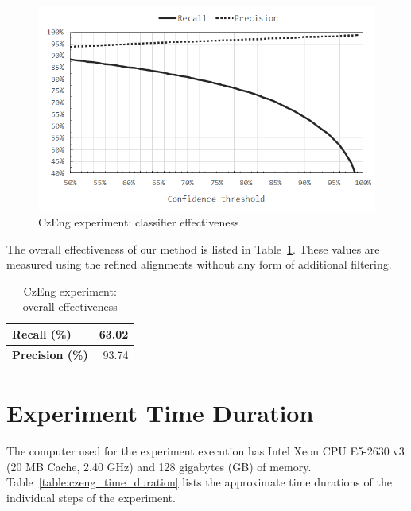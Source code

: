 \begin{figure}[!htb]
	\centering
	\caption{CzEng experiment: classifier effectiveness}
	\label{figure:czeng_classifier}
	\vspace{1em}
	\includegraphics[width=1.00\textwidth]{images/czeng_classifier.png}
\end{figure}

The overall effectiveness of our method is listed in Table~\ref{table:czeng_overall}. These values are measured using the refined alignments without any form of additional filtering.

\begin{table}[!htb]
	\centering
	\caption{CzEng experiment: overall effectiveness}
	\label{table:czeng_overall}
	\vspace{1em}
	\begin{tabular}{|l|r|}
		\hline
		\textbf{Recall (\%)} & 63.02 \\
		\hline
		\textbf{Precision (\%)} & 93.74 \\
		\hline
	\end{tabular}
\end{table}

\section{Experiment Time Duration}
\label{section:czeng_experiment_duration}

The computer used for the experiment execution has Intel\textregistered{} Xeon\textregistered{} CPU E5-2630 v3 (20 MB Cache, 2.40 GHz) and 128 gigabytes (GB) of memory. Table~\ref{table:czeng_time_duration} lists the approximate time durations of the individual steps of the experiment.

